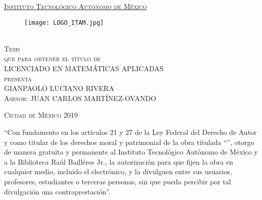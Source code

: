 \documentclass[../Main/Main.tex]{subfiles}
\begin{document}

\begin{titlepage}
\begin{center}

\underline{\textsc{\Large Instituto Tecnológico Autónomo de México}}\\[3em]

\begin{figure}[h]
\begin{center}
\texttt{[image: LOGO\_ITAM.jpg]}
\end{center}
\end{figure}

\vspace{2em}

\textsc{\LARGE \textbf{\tituloMayus}}\\[2em]

\textsc{\large Tesis}\\[1em]

\textsc{que para obtener el título de}\\[1em]

\textsc{LICENCIADO EN MATEMÁTICAS APLICADAS}\\[1em]

\textsc{presenta}\\[1em]

\textsc{\Large GIANPAOLO LUCIANO RIVERA}\\[1em]

\textsc{\large Asesor: JUAN CARLOS MARTÍNEZ-OVANDO}

\end{center}

\vspace*{\fill}
\textsc{Ciudad de México \hspace*{\fill} 2019}

\end{titlepage}

\thispagestyle{empty}

\begingroup
``Con fundamento en los artículos 21 y 27 de la Ley Federal del Derecho de Autor y como titular de los derechos moral y patrimonial de la obra titulada ``\textbf{\tituloMayus}'', otorgo de manera gratuita y permanente al Instituto Tecnológico Autónomo de México y a la Biblioteca Raúl Bailléres Jr., la autorización para que fijen la obra en cualquier medio, incluido el electrónico, y la divulguen entre sus usuarios, profesores, estudiantes o terceras personas, sin que pueda percibir por tal divulgación una contraprestación''.
\end{document}
